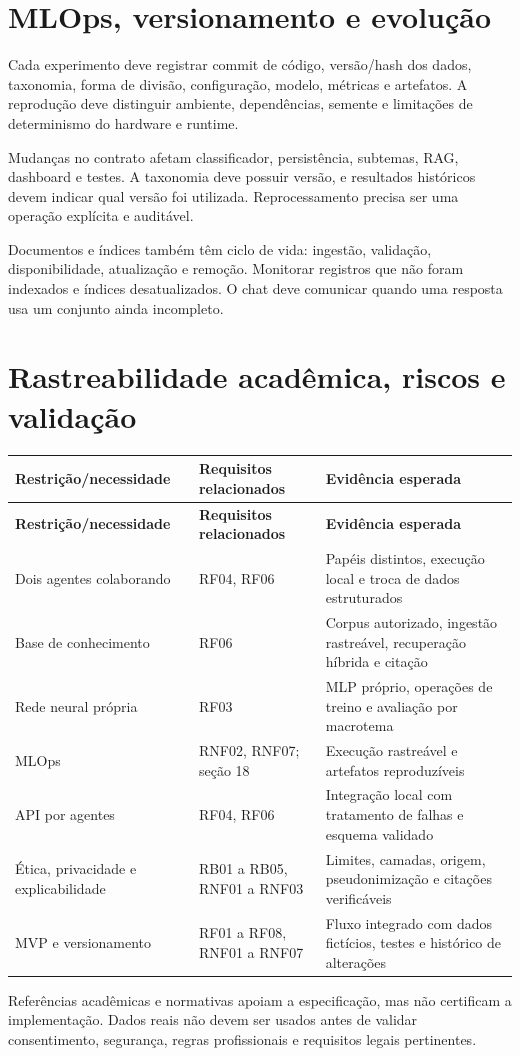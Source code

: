 \documentclass[11pt,a4paper]{article}
\begin{document}
\section{MLOps, versionamento e evolução}
Cada experimento deve registrar commit de código, versão/hash dos dados, taxonomia, forma de divisão, configuração, modelo, métricas e artefatos. A reprodução deve distinguir ambiente, dependências, semente e limitações de determinismo do hardware e runtime.

Mudanças no contrato afetam classificador, persistência, subtemas, RAG, dashboard e testes. A taxonomia deve possuir versão, e resultados históricos devem indicar qual versão foi utilizada. Reprocessamento precisa ser uma operação explícita e auditável.

Documentos e índices também têm ciclo de vida: ingestão, validação, disponibilidade, atualização e remoção. Monitorar registros que não foram indexados e índices desatualizados. O chat deve comunicar quando uma resposta usa um conjunto ainda incompleto.

\section{Rastreabilidade acadêmica, riscos e validação}
\begingroup\small
\begin{longtable}{>{\raggedright\arraybackslash}p{}>{\raggedright\arraybackslash}p{}>{\raggedright\arraybackslash}p{}}
\toprule
\textbf{Restrição/necessidade} & \textbf{Requisitos relacionados} & \textbf{Evidência esperada} \\ \midrule\endfirsthead
\toprule
\textbf{Restrição/necessidade} & \textbf{Requisitos relacionados} & \textbf{Evidência esperada} \\ \midrule\endhead
\bottomrule\endfoot
Dois agentes colaborando & RF04, RF06 & Papéis distintos, execução local e troca de dados estruturados \\[3pt]
Base de conhecimento & RF06 & Corpus autorizado, ingestão rastreável, recuperação híbrida e citação \\[3pt]
Rede neural própria & RF03 & MLP próprio, operações de treino e avaliação por macrotema \\[3pt]
MLOps & RNF02, RNF07; seção 18 & Execução rastreável e artefatos reproduzíveis \\[3pt]
API por agentes & RF04, RF06 & Integração local com tratamento de falhas e esquema validado \\[3pt]
Ética, privacidade e explicabilidade & RB01 a RB05, RNF01 a RNF03 & Limites, camadas, origem, pseudonimização e citações verificáveis \\[3pt]
MVP e versionamento & RF01 a RF08, RNF01 a RNF07 & Fluxo integrado com dados fictícios, testes e histórico de alterações \\[3pt]
\end{longtable}
\endgroup
Referências acadêmicas e normativas apoiam a especificação, mas não certificam a implementação. Dados reais não devem ser usados antes de validar consentimento, segurança, regras profissionais e requisitos legais pertinentes.
\end{document}
